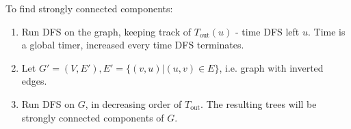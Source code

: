 To find strongly connected components:
\begin{enumerate}
  \item Run DFS on the graph, keeping track of $T_{\text{out}}(u)$ - time DFS left $u$. Time is a global timer, increased every time DFS terminates.
  \item Let $G' = (V, E'), E' = \{(v, u) | (u, v) \in E\}$, i.e. graph with inverted edges.
  \item Run DFS on $G$, in decreasing order of $T_\text{out}$. The resulting trees will be strongly connected components of $G$.
\end{enumerate}


